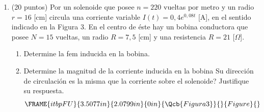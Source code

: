 \documentclass{article}
\begin{document}
\begin{enumerate}
\item (20 puntos) Por un solenoide que posee $n=220$ vueltas por metro y un
radio $r=16$ [cm] circula una corriente variable $I(t)=0,4e^{0,08t}$ [A], en
el sentido indicado en la Figura 3. En el centro de \'{e}ste hay un bobina
conductora que posee $N=15$ vueltas, un radio $R=7,5$ [cm] y una resistencia 
$R=21$ [$\Omega $].

\begin{enumerate}
\item Determine la fem inducida en la bobina.

\item Determine la magnitud de la corriente inducida en la bobina 
\textquestiondown Su direcci\'{o}n de circulaci\'{o}n es la misma que la
corriente sobre el solenoide? Justifique su respuesta.%
\begin{equation*}
\FRAME{itbpFU}{3.5077in}{2.0799in}{0in}{\Qcb{Figura 3}}{}{Figure}{\special%
{language "Scientific Word";type "GRAPHIC";maintain-aspect-ratio
TRUE;display "USEDEF";valid_file "T";width 3.5077in;height 2.0799in;depth
0in;original-width 6.4913in;original-height 3.8337in;cropleft "0";croptop
"1";cropright "1";cropbottom "0";tempfilename
'QWLOE204.wmf';tempfile-properties "XPR";}}
\end{equation*}
\end{enumerate}
\end{enumerate}
\end{document}

